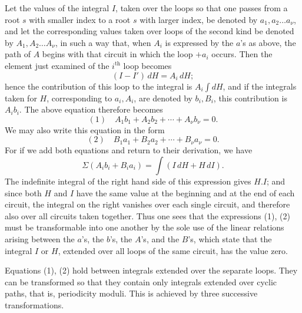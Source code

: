 \documentclass[10pt]{article}
\begin{document}
Let the values of the integral \(I\), taken over the loops so that one passes from a root \(s\) with smaller index to a root \(s\) with larger index, be denoted by \(a_1,a_2\ldots a_{\nu}\), and let the corresponding values taken over loops of the second kind be denoted by \(A_1,A_2\ldots A_{\nu}\), in such a way that, when \(A_i\) is expressed by the \(a\)'s as above, the path of \(A\) begins with that circuit in which the loop \(+a_i\) occurs. Then the element just examined of the \(i^{\text{th}}\) loop becomes
\[
(I-I')\,dH=A_i\,dH;
\]
hence the contribution of this loop to the integral is \(A_i\int dH\), and if the integrals taken for \(H\), corresponding to \(a_i,A_i\), are denoted by \(b_i,B_i\), this contribution is \(A_i b_i\). The above equation therefore becomes
\[
(1)\quad A_1b_1+A_2b_2+\cdots+A_{\nu}b_{\nu}=0.
\]
We may also write this equation in the form
\[
(2)\quad B_1a_1+B_2a_2+\cdots+B_{\nu}a_{\nu}=0.
\]
For if we add both equations and return to their derivation, we have
\[
\Sigma(A_i b_i+B_i a_i)=\int(I\,dH+H\,dI).
\]
The indefinite integral of the right hand side of this expression gives \(H.I\); and since both \(H\) and \(I\) have the same value at the beginning and at the end of each circuit, the integral on the right vanishes over each single circuit, and therefore also over all circuits taken together. Thus one sees that the expressions (1), (2) must be transformable into one another by the sole use of the linear relations arising between the \(a\)'s, the \(b\)'s, the \(A\)'s, and the \(B\)'s, which state that the integral \(I\) or \(H\), extended over all loops of the same circuit, has the value zero.

Equations (1), (2) hold between integrals extended over the separate loops. They can be transformed so that they contain only integrals extended over cyclic paths, that is, periodicity moduli. This is achieved by three successive transformations.
\end{document}
